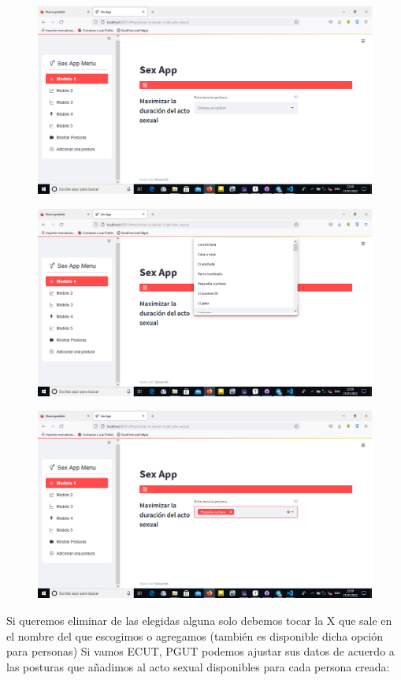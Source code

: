 \documentclass{llncs}
\begin{document}
\begin{figure}
	\centering
	\includegraphics[width=0.7\linewidth]{Imagenes/aplicacion/web8}
	\label{fig:web8}
\end{figure}
\begin{figure}
	\centering
	\includegraphics[width=0.7\linewidth]{Imagenes/aplicacion/web9}
	\label{fig:web9}
\end{figure}
\begin{figure}
	\centering
	\includegraphics[width=0.7\linewidth]{Imagenes/aplicacion/web10}
	\label{fig:web10}
\end{figure}

Si queremos eliminar de las elegidas alguna solo debemos tocar la X que sale en el nombre del que escogimos o agregamos (también es disponible dicha opción para personas)
\newline
\newline
Si vamos ECUT, PGUT podemos ajustar sus datos de acuerdo a las posturas que añadimos al acto sexual disponibles para cada persona creada:
\end{document}
